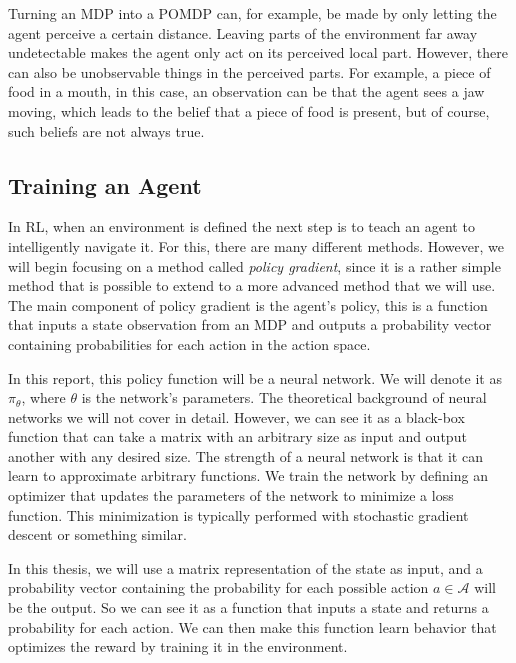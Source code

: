 \documentclass[12pt,A4]{report}
\theoremstyle{definition}
\begin{document}
Turning an MDP into a POMDP can, for example, be made by only letting the agent perceive a certain distance. Leaving parts of the environment far away undetectable makes the agent only act on its perceived local part. However, there can also be unobservable things in the perceived parts. For example, a piece of food in a mouth, in this case, an observation can be that the agent sees a jaw moving, which leads to the belief that a piece of food is present, but of course, such beliefs are not always true. 


\subsection{Training an Agent}

In RL, when an environment is defined the next step is to teach an agent to intelligently navigate it. For this, there are many different methods. However, we will begin focusing on a method called \textit{policy gradient}, since it is a rather simple method that is possible to extend to a more advanced method that we will use. The main component of policy gradient is the agent's policy, this is a function that inputs a state observation from an MDP and outputs a probability vector containing probabilities for each action in the action space. 

In this report, this policy function will be a neural network. We will denote it as $\pi_\theta$, where $\theta$ is the network's parameters. The theoretical background of neural networks we will not cover in detail. However, we can see it as a black-box function that can take a matrix with an arbitrary size as input and output another with any desired size. The strength of a neural network is that it can learn to approximate arbitrary functions. We train the network by defining an optimizer that updates the parameters of the network to minimize a loss function. This minimization is typically performed with stochastic gradient descent or something similar.  

In this thesis, we will use a matrix representation of the state as input, and a probability vector containing the probability for each possible action $a \in \mathcal{A}$ will be the output. So we can see it as a function that inputs a state and returns a probability for each action. We can then make this function learn behavior that optimizes the reward by training it in the environment.
\end{document}
